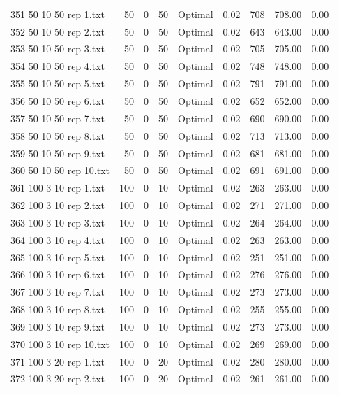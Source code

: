 \begin{longtable}{lrrllrrrr}
351 50 10 50 rep 1.txt & 50 & 0 & 50 & Optimal &  0.02 & 708 & 708.00 &  0.00\\
352 50 10 50 rep 2.txt & 50 & 0 & 50 & Optimal &  0.02 & 643 & 643.00 &  0.00\\
353 50 10 50 rep 3.txt & 50 & 0 & 50 & Optimal &  0.02 & 705 & 705.00 &  0.00\\
354 50 10 50 rep 4.txt & 50 & 0 & 50 & Optimal &  0.02 & 748 & 748.00 &  0.00\\
355 50 10 50 rep 5.txt & 50 & 0 & 50 & Optimal &  0.02 & 791 & 791.00 &  0.00\\
356 50 10 50 rep 6.txt & 50 & 0 & 50 & Optimal &  0.02 & 652 & 652.00 &  0.00\\
357 50 10 50 rep 7.txt & 50 & 0 & 50 & Optimal &  0.02 & 690 & 690.00 &  0.00\\
358 50 10 50 rep 8.txt & 50 & 0 & 50 & Optimal &  0.02 & 713 & 713.00 &  0.00\\
359 50 10 50 rep 9.txt & 50 & 0 & 50 & Optimal &  0.02 & 681 & 681.00 &  0.00\\
360 50 10 50 rep 10.txt & 50 & 0 & 50 & Optimal &  0.02 & 691 & 691.00 &  0.00\\
361 100 3 10 rep 1.txt & 100 & 0 & 10 & Optimal &  0.02 & 263 & 263.00 &  0.00\\
362 100 3 10 rep 2.txt & 100 & 0 & 10 & Optimal &  0.02 & 271 & 271.00 &  0.00\\
363 100 3 10 rep 3.txt & 100 & 0 & 10 & Optimal &  0.02 & 264 & 264.00 &  0.00\\
364 100 3 10 rep 4.txt & 100 & 0 & 10 & Optimal &  0.02 & 263 & 263.00 &  0.00\\
365 100 3 10 rep 5.txt & 100 & 0 & 10 & Optimal &  0.02 & 251 & 251.00 &  0.00\\
366 100 3 10 rep 6.txt & 100 & 0 & 10 & Optimal &  0.02 & 276 & 276.00 &  0.00\\
367 100 3 10 rep 7.txt & 100 & 0 & 10 & Optimal &  0.02 & 273 & 273.00 &  0.00\\
368 100 3 10 rep 8.txt & 100 & 0 & 10 & Optimal &  0.02 & 255 & 255.00 &  0.00\\
369 100 3 10 rep 9.txt & 100 & 0 & 10 & Optimal &  0.02 & 273 & 273.00 &  0.00\\
370 100 3 10 rep 10.txt & 100 & 0 & 10 & Optimal &  0.02 & 269 & 269.00 &  0.00\\
371 100 3 20 rep 1.txt & 100 & 0 & 20 & Optimal &  0.02 & 280 & 280.00 &  0.00\\
372 100 3 20 rep 2.txt & 100 & 0 & 20 & Optimal &  0.02 & 261 & 261.00 &  0.00\\

\end{longtable}
